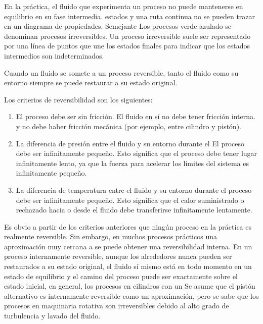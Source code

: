 En la práctica, el fluido que experimenta un proceso no puede mantenerse en equilibrio en su fase intermedia.
estados y una ruta continua no se pueden trazar en un diagrama de propiedades. Semejante
Los procesos verde azulado se denominan procesos irreversibles. Un proceso irreversible suele ser
representado por una línea de puntos que une los estados finales para indicar que
los estados intermedios son indeterminados.

\begin{definition}[Reversibilidad]
    Cuando un fluido se somete a un proceso reversible, tanto el fluido como su entorno
siempre se puede restaurar a su estado original.
\end{definition}


Los criterios de reversibilidad son los siguientes:

\begin{enumerate}
    \item El proceso debe ser sin fricción. El fluido en sí no debe tener fricción interna.
    y no debe haber fricción mecánica (por ejemplo, entre cilindro y pistón).
    \item La diferencia de presión entre el fluido y su entorno durante el
    El proceso debe ser infinitamente pequeño. Esto significa que el proceso debe tener lugar
    infinitamente lento, ya que la fuerza para acelerar los límites del sistema
    es infinitamente pequeño.
    \item  La diferencia de temperatura entre el fluido y su entorno durante
    el proceso debe ser infinitamente pequeño. Esto significa que el calor suministrado o
    rechazado hacia o desde el fluido debe transferirse infinitamente lentamente.
\end{enumerate}



Es obvio a partir de los criterios anteriores que ningún proceso en la práctica es realmente
reversible. Sin embargo, en muchos procesos prácticos una aproximación muy cercana a
se puede obtener una reversibilidad interna. En un proceso internamente reversible,
aunque los alrededores nunca pueden ser restaurados a su estado original, el fluido
sí mismo está en todo momento en un estado de equilibrio y el camino del proceso puede ser
exactamente sobre el estado inicial, en general, los procesos en cilindros con un
Se asume que el pistón alternativo es internamente reversible como un
aproximación, pero se sabe que los procesos en maquinaria rotativa
son irreversibles debido al alto grado de turbulencia y lavado del fluido.

